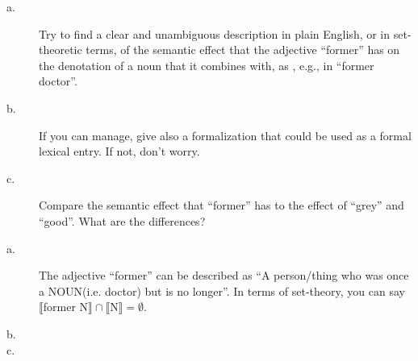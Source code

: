\documentclass[11pt]{article}
\begin{document}
\vspace*{0.5cm}

\begin{problem}{3}
\begin{description}
    \item[a.] Try to find a clear and unambiguous description in plain English, or in set-theoretic terms, of the semantic effect that the adjective ``former'' has on the denotation of a noun that it combines with, as , e.g., in ``former doctor''.

    \item[b.] If you can manage, give also a formalization that could be used as a formal lexical entry. If not, don't worry.

    \item[c.] Compare the semantic effect that ``former'' has to the effect of ``grey'' and ``good''. What are the differences?
\end{description}
\end{problem}

\begin{solution}
\begin{description}
    \item[a.] The adjective ``former'' can be described as ``A person/thing who was once a NOUN(i.e. doctor) but is no longer''.  In terms of set-theory, you can say $\llbracket$former N$\rrbracket \cap$$\llbracket$N$\rrbracket = \emptyset$. 

    \item[b.]

    \item[c.]
\end{description}
\end{solution}
\end{document}
